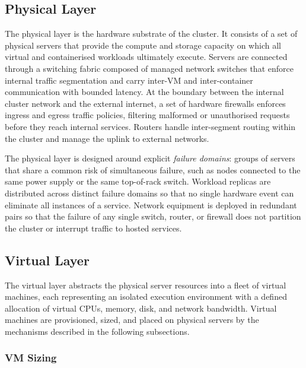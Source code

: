 \documentclass[a4paper, 12pt]{report}
\begin{document}
\subsection{Physical Layer}
 
The physical layer is the hardware substrate of the cluster.  It consists
of a set of physical servers that provide the compute and storage
capacity on which all virtual and containerised workloads ultimately
execute.  Servers are connected through a switching fabric composed of
managed network switches that enforce internal traffic segmentation and
carry inter-VM and inter-container communication with bounded latency.
At the boundary between the internal cluster network and the external
internet, a set of hardware firewalls enforces ingress and egress traffic
policies, filtering malformed or unauthorised requests before they reach
internal services.  Routers handle inter-segment routing within the
cluster and manage the uplink to external networks.
 
The physical layer is designed around explicit \textit{failure domains}:
groups of servers that share a common risk of simultaneous failure, such
as nodes connected to the same power supply or the same top-of-rack
switch.  Workload replicas are distributed across distinct failure domains
so that no single hardware event can eliminate all instances of a
service.  Network equipment is deployed in redundant pairs so that the
failure of any single switch, router, or firewall does not partition the
cluster or interrupt traffic to hosted services.
 
\subsection{Virtual Layer}
 
The virtual layer abstracts the physical server resources into a fleet
of virtual machines, each representing an isolated execution environment
with a defined allocation of virtual CPUs, memory, disk, and network
bandwidth.  Virtual machines are provisioned, sized, and placed on
physical servers by the mechanisms described in the following
subsections.
 
\subsubsection{VM Sizing}
 
\end{document}
